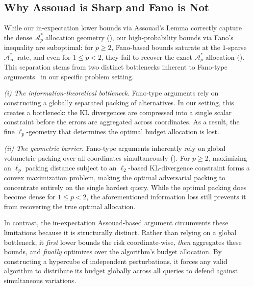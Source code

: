 \documentclass{article}
\theoremstyle{plain}
\theoremstyle{definition}
\theoremstyle{plain}
\begin{document}
\subsection{Why Assouad is Sharp and Fano is Not}

While our in-expectation lower bounds via Assouad's Lemma correctly capture the dense $\mathcal{A}_p^*$ allocation geometry (), our high-probability bounds via Fano's inequality are suboptimal: for $p \geq 2$, Fano-based bounds saturate at the $1$-sparse $\mathcal{A}_\infty^*$ rate, and even for $1 \leq p < 2$, they fail to recover the exact $\mathcal{A}_p^*$ allocation (). This separation stems from two distinct bottlenecks inherent to Fano-type arguments~\citep{tsybakov} in our specific problem setting.

{\it (i) The information-theoretical bottleneck.} Fano-type arguments rely on constructing a globally separated packing of alternatives.  In our setting, this creates a bottleneck: the KL divergences are compressed into a single scalar constraint before the errors are aggregated across coordinates. 
As a result, the fine \(\ell_p\)-geometry that determines the optimal budget allocation is lost.

{\it (ii) The geometric barrier.} Fano-type arguments inherently rely on global volumetric packing over all coordinates simultaneously (). For $p \ge 2$, maximizing an $\ell_p$ packing distance subject to an $\ell_2$-based KL-divergence constraint forms a convex maximization problem, making the optimal adversarial packing to concentrate entirely on the single hardest query. While the optimal packing does become dense for $1 \leq p < 2$, the aforementioned information loss still prevents it from recovering the true optimal allocation.

In contrast, the in-expectation Assouad-based argument circumvents these limitations because it is structurally distinct. Rather than relying on a global bottleneck, it \emph{first} lower bounds the risk coordinate-wise, \emph{then} aggregates these bounds, and \emph{finally} optimizes over the algorithm's budget allocation. By constructing a hypercube of independent perturbations, it forces any valid algorithm to distribute its budget globally across all queries to defend against simultaneous variations.






    
\end{document}
